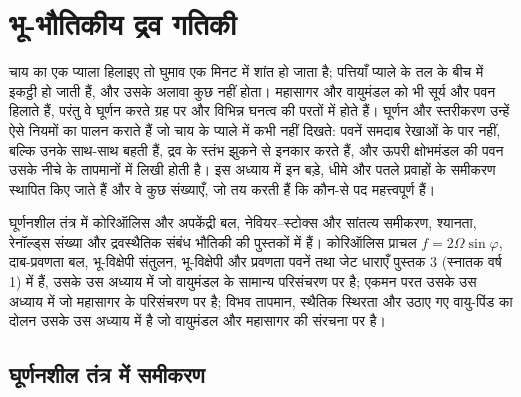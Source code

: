 \chapter{भू-भौतिकीय द्रव गतिकी}\label{ch:b3:gfd-foundations}

चाय का एक प्याला हिलाइए तो घुमाव एक मिनट में शांत हो जाता है; पत्तियाँ
प्याले के तल के बीच में इकट्ठी हो जाती हैं, और उसके अलावा कुछ नहीं होता।
महासागर और वायुमंडल को भी सूर्य और पवन हिलाते हैं, परंतु वे घूर्णन करते ग्रह पर
और विभिन्न घनत्व की परतों में होते हैं। घूर्णन और स्तरीकरण उन्हें ऐसे नियमों का पालन कराते हैं
जो चाय के प्याले में कभी नहीं दिखते: पवनें समदाब रेखाओं के पार नहीं, बल्कि उनके साथ-साथ बहती हैं,
द्रव के स्तंभ झुकने से इनकार करते हैं, और ऊपरी क्षोभमंडल की पवन
उसके नीचे के तापमानों में लिखी होती है। इस अध्याय में इन बड़े, धीमे और पतले प्रवाहों के समीकरण स्थापित किए जाते हैं
और वे कुछ संख्याएँ, जो तय करती हैं
कि कौन-से पद महत्त्वपूर्ण हैं।

\begin{recall}
घूर्णनशील तंत्र में कोरिऑलिस और अपकेंद्री बल, नेवियर–स्टोक्स और सांतत्य समीकरण,
श्यानता, रेनॉल्ड्स संख्या और द्रवस्थैतिक संबंध भौतिकी की पुस्तकों में हैं।
कोरिऑलिस प्राचल $f = 2\Omega
\sin\varphi$, दाब-प्रवणता बल, भू-विक्षेपी संतुलन, भू-विक्षेपी और प्रवणता पवनें
तथा जेट धाराएँ पुस्तक 3 (स्नातक वर्ष 1) में हैं,
उसके उस अध्याय में जो वायुमंडल के सामान्य परिसंचरण पर है;
एकमन परत उसके उस अध्याय में जो महासागर के परिसंचरण पर है;
विभव तापमान, स्थैतिक स्थिरता और उठाए गए वायु-पिंड का दोलन उसके उस अध्याय में है
जो वायुमंडल और महासागर की संरचना पर है।
\end{recall}

\section{घूर्णनशील तंत्र में समीकरण}\label{sec:b3:gfd-foundations:equations}

